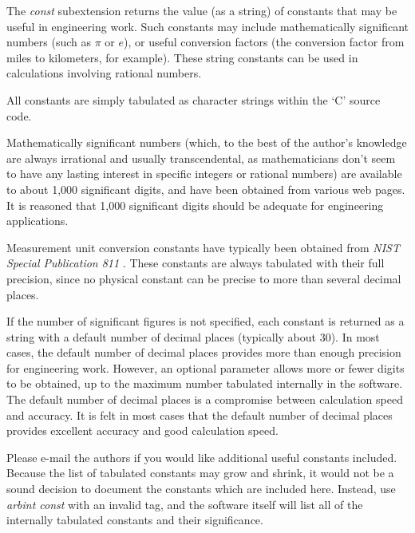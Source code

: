 \begin{tclcommanddescription}
The \emph{const} subextension returns the value (as a string) of
constants that may be useful in engineering work.  Such constants
may include mathematically significant numbers (such as 
$\pi$ or 
$e$), or 
useful conversion factors (the conversion factor from 
miles to kilometers, for example).  These string constants
can be used in calculations involving rational numbers.

All constants are simply tabulated as character strings
within the `C' source code.

Mathematically significant numbers (which, to the best
of the author's knowledge are always irrational and
usually transcendental, as mathematicians
don't seem to have any lasting interest in specific integers
or rational numbers) are available to about 1,000 significant digits,
and have been obtained from various web pages.  It is reasoned that
1,000 significant digits should be adequate for engineering applications.

Measurement unit conversion constants have typically been obtained from
\emph{NIST Special Publication 811} \cite{bibref:b:nistsp811:1995ed}.
These constants are always tabulated with their full precision, since
no physical constant can be precise to more than several decimal places.

If the number of significant figures is not specified, 
each constant is returned as a string with a default number of
decimal places (typically about 30).  In most cases, the default
number of decimal places provides more than enough precision for
engineering work.  However, an optional parameter allows more
or fewer digits to be obtained, up to the maximum number tabulated internally
in the software.  The default number of decimal places is a compromise
between calculation speed and accuracy.  It is felt in most cases that
the default number of decimal places provides excellent accuracy
and good calculation speed.

Please e-mail the authors if you would like additional useful 
constants included.  Because the list of tabulated constants
may grow and shrink, it would not be a sound decision to document
the constants which are included here.  Instead, use
\emph{arbint const} with an invalid tag, and the software itself
will list all of the internally tabulated constants and their
significance.
\end{tclcommanddescription}

